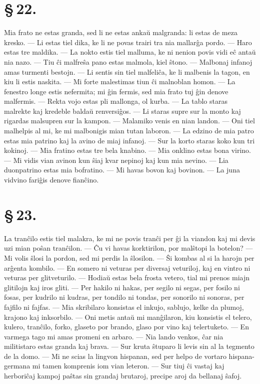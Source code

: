 \section*{\S\,22.}
Mia frato ne estas granda, sed li ne estas anka\u u malgranda: li
estas de meza kresko. --- Li estas tiel dika, ke li ne povas trairi
tra nia mallar\^ga pordo. --- Haro estas tre maldika. --- La nokto
estis tiel malluma, ke ni nenion povis vidi e\^c anta\u u nia nazo.
--- Tiu \^ci malfre\^sa pano estas malmola, kiel \^stono. --- Malbonaj
infanoj amas turmenti bestojn. --- Li sentis sin tiel malfeli\^ca,
ke li malbenis la tagon, en kiu li estis naskita. --- Mi forte
malestimas tiun \^ci malnoblan homon. --- La fenestro longe estis
nefermita; mi \^gin fermis, sed mia frato tuj \^gin denove
malfermis. --- Rekta vojo estas pli mallonga, ol kurba. --- La tablo
staras malrekte kaj kredeble balda\u u renversi\^gos. --- Li staras
supre sur la monto kaj rigardas malsupren sur la kampon. ---
Malamiko venis en nian landon. --- Oni tiel malhelpis al mi, ke mi
malbonigis mian tutan laboron. --- La edzino de mia patro estas mia
patrino kaj la avino de miaj infanoj. --- Sur la korto staras koko
kun tri kokinoj. --- Mia fratino estas tre bela knabino. --- Mia
onklino estas bona virino. --- Mi vidis vian avinon kun \^siaj kvar
nepinoj kaj kun mia nevino. --- Lia duonpatrino estas mia bofratino.
--- Mi havas bovon kaj bovinon. --- La juna vidvino fari\^gis denove
fian\^cino.


\section*{\S\,23.}
La tran\^cilo estis tiel malakra, ke mi ne povis tran\^ci per \^gi
la viandon kaj mi devis uzi mian po\^san tran\^cilon. --- \^Cu vi
havas korktirilon, por mal\^stopi la botelon? --- Mi volis \^slosi
la pordon, sed mi perdis la \^slosilon. --- \^Si kombas al si la
harojn per ar\^genta kombilo. --- En somero ni veturas per diversaj
veturiloj, kaj en vintro ni veturas per glitveturilo. --- Hodia\u u
estas bela frosta vetero, tial mi prenos miajn glitilojn kaj iros
gliti. --- Per hakilo ni hakas, per segilo ni segas, per fosilo ni
fosas, per kudrilo ni kudras, per tondilo ni tondas, per sonorilo ni
sonoras, per fajfilo ni fajfas. --- Mia skribilaro konsistas el
inkujo, sablujo, kelke da plumoj, krajono kaj inksorbilo. --- Oni
metis anta\u u mi man\^gilaron, kiu konsistis el telero, kulero,
tran\^cilo, forko, glaseto por brando, glaso por vino kaj
telertuketo. --- En varmega tago mi amas promeni en arbaro. --- Nia
lando venkos, \^car nia militistaro estas granda kaj brava. --- Sur
kruta \^stuparo li levis sin al la tegmento de la domo. --- Mi ne
scias la lingvon hispanan, sed per helpo de vortaro hispana-germana
mi tamen komprenis iom vian leteron. --- Sur tiuj \^ci vastaj kaj
herbori\^caj kampoj pa\^stas sin grandaj brutaroj, precipe aroj da
bellanaj \^safoj.


